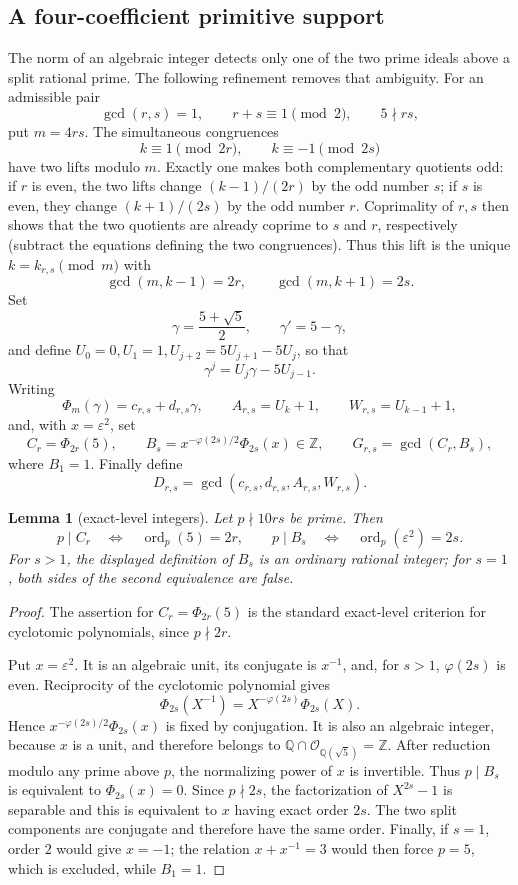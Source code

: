 \documentclass[11pt]{amsart}
\newtheorem{lemma}[theorem]{Lemma}
\theoremstyle{definition}
\theoremstyle{remark}
\newcommand{\Z}{\mathbb{Z}}
\newcommand{\Q}{\mathbb{Q}}
\newcommand{\eps}{\varepsilon}
\newcommand{\ord}{\operatorname{ord}}
\begin{document}
\subsection{A four-coefficient primitive support}\label{subsec:Hfour}

The norm of an algebraic integer detects only one of the two prime ideals
above a split rational prime. The following refinement removes that
ambiguity. For an admissible pair
\[
\gcd(r,s)=1,\qquad r+s\equiv1\pmod2,\qquad5\nmid rs,
\]
put \(m=4rs\). The simultaneous congruences
\[
k\equiv1\pmod{2r},\qquad k\equiv-1\pmod{2s}
\]
have two lifts modulo \(m\). Exactly one makes both complementary
quotients odd: if \(r\) is even, the two lifts change
\((k-1)/(2r)\) by the odd number \(s\); if \(s\) is even, they change
\((k+1)/(2s)\) by the odd number \(r\). Coprimality of \(r,s\) then
shows that the two quotients are already coprime to \(s\) and \(r\),
respectively (subtract the equations defining the two congruences).
Thus this lift is the unique \(k=k_{r,s}\pmod m\) with
\[
\gcd(m,k-1)=2r,\qquad \gcd(m,k+1)=2s.
\tag{4.5}
\]
Set
\[
\gamma=\frac{5+\sqrt5}{2},\qquad \gamma'=5-\gamma,
\]
and define \(U_0=0,U_1=1,U_{j+2}=5U_{j+1}-5U_j\), so that
\[
\gamma^j=U_j\gamma-5U_{j-1}.
\]
Writing
\[
\Phi_m(\gamma)=c_{r,s}+d_{r,s}\gamma,\qquad
A_{r,s}=U_k+1,\qquad W_{r,s}=U_{k-1}+1,
\]
and, with \(x=\eps^2\), set
\[
C_r=\Phi_{2r}(5),\qquad
B_s=x^{-\varphi(2s)/2}\Phi_{2s}(x)\in\Z,\qquad
G_{r,s}=\gcd(C_r,B_s),
\]
where \(B_1=1\). Finally define
\[
D_{r,s}=\gcd(c_{r,s},d_{r,s},A_{r,s},W_{r,s}).
\tag{4.6}
\]

\begin{lemma}[exact-level integers]\label{lem:exactlevel}
Let \(p\nmid10rs\) be prime. Then
\[
p\mid C_r\quad\Longleftrightarrow\quad \ord_p(5)=2r,
\qquad
p\mid B_s\quad\Longleftrightarrow\quad \ord_p(\eps^2)=2s.
\]
For \(s>1\), the displayed definition of \(B_s\) is an ordinary rational
integer; for \(s=1\), both sides of the second equivalence are false.
\end{lemma}

\begin{proof}
The assertion for \(C_r=\Phi_{2r}(5)\) is the standard exact-level
criterion for cyclotomic polynomials, since \(p\nmid2r\).

Put \(x=\eps^2\). It is an algebraic unit, its conjugate is \(x^{-1}\),
and, for \(s>1\), \(\varphi(2s)\) is even. Reciprocity of the
cyclotomic polynomial gives
\[
\Phi_{2s}(X^{-1})=X^{-\varphi(2s)}\Phi_{2s}(X).
\]
Hence \(x^{-\varphi(2s)/2}\Phi_{2s}(x)\) is fixed by conjugation.
It is also an algebraic integer, because \(x\) is a unit, and therefore
belongs to \(\Q\cap\mathcal O_{\Q(\sqrt5)}=\Z\).
After reduction modulo any prime above \(p\), the normalizing power of
\(x\) is invertible. Thus \(p\mid B_s\) is equivalent to
\(\Phi_{2s}(x)=0\). Since \(p\nmid2s\), the factorization of
\(X^{2s}-1\) is separable and this is equivalent to \(x\) having exact
order \(2s\). The two split components are conjugate and therefore have
the same order. Finally, if \(s=1\), order \(2\) would give \(x=-1\);
the relation \(x+x^{-1}=3\) would then force \(p=5\), which is excluded,
while \(B_1=1\).
\end{proof}
\end{document}
